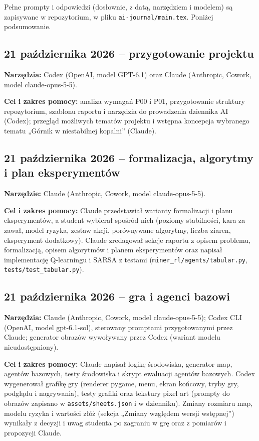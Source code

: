 Pełne prompty i odpowiedzi (dosłownie, z datą, narzędziem i modelem) są zapisywane
w repozytorium, w pliku \texttt{ai-journal/main.tex}. Poniżej podsumowanie.

\subsection*{21 października 2026 -- przygotowanie projektu}
\textbf{Narzędzia:} Codex (OpenAI, model GPT-6.1)
oraz Claude (Anthropic, Cowork, model claude-opus-5-5).

\textbf{Cel i zakres pomocy:} analiza wymagań P00 i P01, przygotowanie struktury
repozytorium, szablonu raportu i narzędzia do prowadzenia dziennika AI
(Codex); przegląd możliwych tematów projektu i wstępna koncepcja wybranego
tematu „Górnik w niestabilnej kopalni” (Claude).

\subsection*{21 października 2026 -- formalizacja, algorytmy i plan eksperymentów}
\textbf{Narzędzie:} Claude (Anthropic, Cowork, model claude-opus-5-5).

\textbf{Cel i zakres pomocy:} Claude przedstawiał warianty formalizacji i planu
eksperymentów, a student wybierał spośród nich (poziomy stabilności, kara za
zawał, model ryzyka, zestaw akcji, porównywane algorytmy, liczba ziaren,
eksperyment dodatkowy). Claude zredagował sekcje raportu z opisem problemu,
formalizacją, opisem algorytmów i planem eksperymentów oraz napisał
implementację Q-learningu i SARSA z testami (\texttt{miner\_rl/agents/tabular.py},
\texttt{tests/test\_tabular.py}).

\subsection*{21 października 2026 -- gra i agenci bazowi}
\textbf{Narzędzia:} Claude (Anthropic, Cowork, model claude-opus-5-5);
Codex CLI (OpenAI, model gpt-6.1-sol), sterowany promptami przygotowanymi przez
Claude; generator obrazów wywoływany przez Codex (wariant modelu nieudostępniony).

\textbf{Cel i zakres pomocy:} Claude napisał logikę środowiska, generator map,
agentów bazowych, testy środowiska i skrypt ewaluacji agentów bazowych. Codex
wygenerował grafikę gry (renderer pygame, menu, ekran końcowy, tryby gry,
podglądu i nagrywania), testy grafiki oraz tekstury pixel art (prompty do obrazów
zapisano w \texttt{assets/sheets.json} i w dzienniku). Zmiany rozmiaru map,
modelu ryzyka i wartości złóż (sekcja „Zmiany względem wersji wstępnej”) wynikały
z decyzji i uwag studenta po zagraniu w grę oraz z pomiarów i propozycji Claude.

